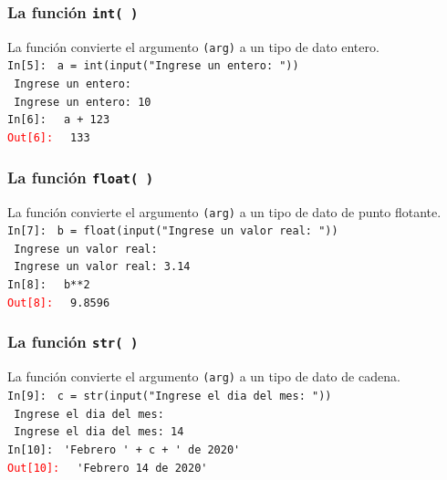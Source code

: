 \begin{frame}[fragile]
\frametitle{La función \texttt{int(\ )}}
La función  convierte el argumento \texttt{(arg)} a un tipo de dato entero.
\\
\bigskip
\textcolor{ao}{\texttt{In[5]: }} \verb|a = int(input("Ingrese un entero: "))|
\\
\pause
\verb| Ingrese un entero: |
\\
\pause
\verb| Ingrese un entero: 10|
\\
\pause
\textcolor{ao}{\texttt{In[6]: }} \verb| a + 123|
\\
\pause
\textcolor{red}{\texttt{Out[6]: }} \verb| 133|
\end{frame}
\begin{frame}[fragile]
\frametitle{La función \texttt{float(\ )}}
La función  convierte el argumento \texttt{(arg)} a un tipo de dato de punto flotante.
\\
\bigskip
\textcolor{ao}{\texttt{In[7]: }} \verb|b = float(input("Ingrese un valor real: "))|
\\
\pause
\verb| Ingrese un valor real: |
\\
\pause
\verb| Ingrese un valor real: 3.14|
\\
\pause
\textcolor{ao}{\texttt{In[8]: }} \verb| b**2|
\\
\pause
\textcolor{red}{\texttt{Out[8]: }} \verb| 9.8596|
\end{frame}
\begin{frame}[fragile]
\frametitle{La función \texttt{str(\ )}}
La función  convierte el argumento \texttt{(arg)} a un tipo de dato de cadena.
\\
\bigskip
\textcolor{ao}{\texttt{In[9]: }} \verb|c = str(input("Ingrese el dia del mes: "))|
\\
\pause
\verb| Ingrese el dia del mes: |
\\
\pause
\verb| Ingrese el dia del mes: 14|
\\
\pause
\textcolor{ao}{\texttt{In[10]: }} \verb|'Febrero ' + c + ' de 2020'|
\\
\pause
\textcolor{red}{\texttt{Out[10]: }} \verb| 'Febrero 14 de 2020'|
\end{frame}
